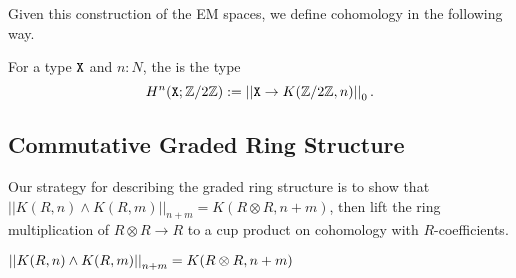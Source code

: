 \documentclass{amsart}
\begin{document}
Given this construction of the EM spaces, we define cohomology in the following way. 

\begin{definition}
	For a type $\mathtt{X}$ and $n:N$, the  is the type
	\[H^n(\mathtt{X};\mathbb{Z}/2\mathbb{Z}):= \left| \left| \mathtt{X}\rightarrow K(\mathbb{Z}/2\mathbb{Z},n)\right| \right|_0.\] 
\end{definition}



\subsection{Commutative Graded Ring Structure}



 Our strategy for describing the graded ring structure is to show that $||K(R,n)\wedge K(R,m)||_{n+m} = K(R\otimes R, n+m)$, then  lift the ring multiplication of $R \otimes R \to R$ to a cup product on cohomology with $R$-coefficients.



\begin{proposition}\label{prop:K_smash}
	$ \left| \left| K(R,n) \wedge K(R,m)\right| \right|_{n+m} = K(R \otimes R, n+m)$
\end{proposition} 
\end{document}
